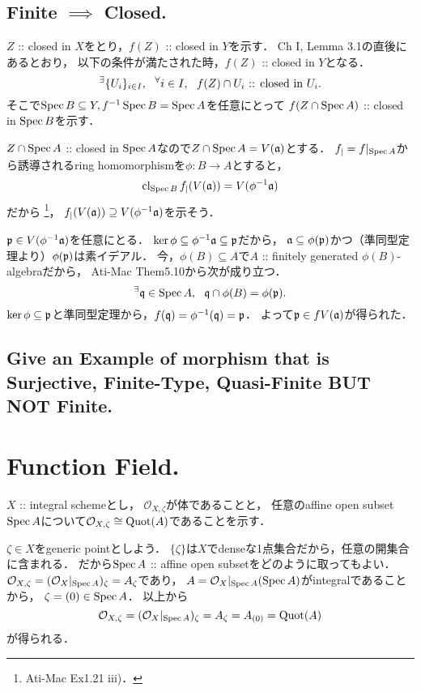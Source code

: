 \documentclass[a4paper]{jsarticle}
\newcommand{\shO}{\mathcal{O}}
\begin{document}
    \subsection{Finite $\implies$ Closed.}
    $Z$ :: closed in $X$をとり，$f(Z)$ :: closed in $Y$を示す．
    Ch I, Lemma 3.1の直後にあるとおり，
    以下の条件が満たされた時，$f(Z)$ :: closed in $Y$となる．
    \[ {}^{\exists} \{U_i\}_{i \in I},~~ {}^{\forall} i \in I,~~ f(Z) \cap U_i\text{ :: closed in }U_i. \]
    そこで$\operatorname{Spec} B \subseteq Y, f^{-1}\operatorname{Spec} B=\operatorname{Spec} A$を任意にとって
    $f(Z \cap \operatorname{Spec} A)$ :: closed in $\operatorname{Spec} B$を示す．

    $Z \cap \operatorname{Spec} A$ :: closed in $\operatorname{Spec} A$なので$Z \cap \operatorname{Spec} A=V(\mathfrak{a})$とする．
    $f_|=f|_{\operatorname{Spec} A}$から誘導されるring homomorphismを$\phi: B \to A$とすると，
    \[ \operatorname{cl}_{\operatorname{Spec} B}f_|(V(\mathfrak{a}))=V(\phi^{-1}\mathfrak{a}) \]だから
    \footnote{Ati-Mac Ex1.21 iii)．}，
    $f_|(V(\mathfrak{a})) \supseteq V(\phi^{-1}\mathfrak{a})$を示そう．
    
    $\mathfrak{p} \in V(\phi^{-1}\mathfrak{a})$を任意にとる．
    $\ker \phi \subseteq \phi^{-1}\mathfrak{a} \subseteq \mathfrak{p}$だから，
    $\mathfrak{a} \subseteq \phi(\mathfrak{p})$かつ（準同型定理より）$\phi(\mathfrak{p})$は素イデアル．
    今，$\phi(B) \subseteq A$で$A$ :: finitely generated $\phi(B)$-algebraだから，
    Ati-Mac Them5.10から次が成り立つ．
    \[ {}^{\exists} \mathfrak{q} \in \operatorname{Spec} A,~~ \mathfrak{q} \cap \phi(B)=\phi(\mathfrak{p}). \]
    $\ker \phi \subseteq \mathfrak{p}$と準同型定理から，$f(\mathfrak{q})=\phi^{-1}(\mathfrak{q})=\mathfrak{p}$．
    よって$\mathfrak{p} \in fV(\mathfrak{a})$が得られた．

    \subsection{Give an Example of morphism that is Surjective, Finite-Type, Quasi-Finite BUT NOT Finite.}

\section{Function Field.} %
    $X$ :: integral schemeとし，
    $\shO_{X, \zeta}$が体であることと，
    任意のaffine open subset $\operatorname{Spec} A$について$\shO_{X, \zeta} \cong \Quot(A)$であることを示す．

    $\zeta \in X$をgeneric pointとしよう．
    $\{\zeta\}$は$X$でdenseな1点集合だから，任意の開集合に含まれる．
    だから$\operatorname{Spec} A$ :: affine open subsetをどのように取ってもよい．
    $\shO_{X,\zeta}=(\shO_X|_{\Spec A})_{\zeta}=A_{\zeta}$であり，
    $A=\shO_X|_{\Spec A}(\Spec A)$がintegralであることから，
    $\zeta=(0) \in \operatorname{Spec} A$．
    以上から
    \[ \shO_{X,\zeta}=(\shO_X|_{\Spec A})_{\zeta}=A_{\zeta}=A_{(0)}=\Quot(A) \]
    が得られる．
\end{document}
